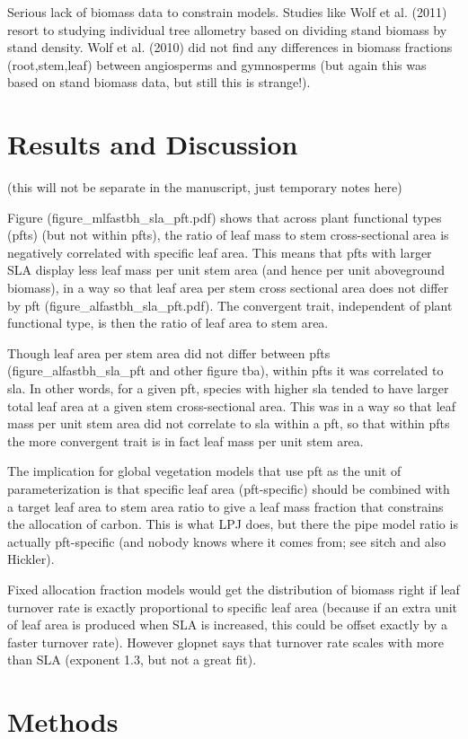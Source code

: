 \documentclass[a4paper]{article}
\begin{document}
Serious lack of biomass data to constrain models. Studies like Wolf et al. (2011) resort to studying individual tree allometry based on dividing stand biomass by stand density. Wolf et al. (2010) did not find any differences in biomass fractions (root,stem,leaf) between angiosperms and gymnosperms (but again this was based on stand biomass data, but still this is strange!).


\section{Results and Discussion}
(this will not be separate in the manuscript, just temporary notes here)

Figure (figure\_mlfastbh\_sla\_pft.pdf) shows that across plant functional types (pfts) (but not within pfts), the ratio of leaf mass to stem cross-sectional area is negatively correlated with specific leaf area. This means that pfts with larger SLA display less leaf mass per unit stem area (and hence per unit aboveground biomass), in a way so that leaf area per stem cross sectional area does not differ by pft (figure\_alfastbh\_sla\_pft.pdf). The convergent trait, independent of plant functional type, is then the ratio of leaf area to stem area.

Though leaf area per stem area did not differ between pfts (figure\_alfastbh\_sla\_pft and other figure tba), within pfts it was correlated to sla. In other words, for a given pft, species with higher sla tended to have larger total leaf area at a given stem cross-sectional area. This was in a way so that leaf mass per unit stem area did not correlate to sla within a pft, so that within pfts the more convergent trait is in fact leaf mass per unit stem area.

The implication for global vegetation models that use pft as the unit of parameterization is that specific leaf area (pft-specific) should be combined with a target leaf area to stem area ratio to give a leaf mass fraction that constrains the allocation of carbon. This is what LPJ does, but there the pipe model ratio is actually pft-specific (and nobody knows where it comes from; see sitch and also Hickler).

Fixed allocation fraction models would get the distribution of biomass right if leaf turnover rate is exactly proportional to specific leaf area (because if an extra unit of leaf area is produced when SLA is increased, this could be offset exactly by a faster turnover rate). However glopnet says that turnover rate scales with more than SLA (exponent 1.3, but not a great fit). 










\section{Methods}
\end{document}
